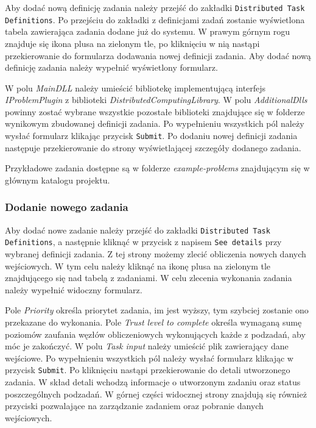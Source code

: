 \documentclass[a4paper,11pt,twoside]{report}
\theoremstyle{definition}
\begin{document}
        Aby dodać nową definicję zadania należy przejść do zakładki \texttt{Distributed Task Definitions}. 
        Po przejściu do zakładki z definicjami zadań zostanie wyświetlona tabela zawierająca zadania dodane już do systemu. 
        W prawym górnym rogu znajduje się ikona plusa na zielonym tle, po kliknięciu w nią nastąpi przekierowanie do formularza dodawania nowej definicji zadania.
        Aby dodać nową definicję zadania należy wypełnić wyświetlony formularz.
        
        W polu \textit{MainDLL} należy umieścić bibliotekę implementującą interfejs \textit{IProblemPlugin} z biblioteki \textit{DistributedComputingLibrary}.
        W polu \textit{AdditionalDlls} powinny zostać wybrane wszystkie pozostałe biblioteki znajdujące się w folderze wynikowym zbudowanej definicji zadania.
        Po wypełnieniu wszystkich pól należy wysłać formularz klikając przycisk \texttt{Submit}.
        Po dodaniu nowej definicji zadania następuje przekierowanie do strony wyświetlającej szczegóły dodanego zadania. 
        
        Przykładowe zadania dostępne są w folderze \textit{example-problems} znajdującym się w głównym katalogu projektu.
        
        
        \subsubsection{Dodanie nowego zadania}
        \label{distributed-task-add-guide}
        
        Aby dodać nowe zadanie należy przejść do zakładki \texttt{Distributed Task Definitions}, a następnie kliknąć w przycisk z napisem \texttt{See details} przy wybranej definicji zadania.
        Z tej strony możemy zlecić obliczenia nowych danych wejściowych.
        W tym celu należy kliknąć na ikonę plusa na zielonym tle znajdującego się nad tabelą z zadaniami.
        W celu zlecenia wykonania zadania należy wypełnić widoczny formularz.
        
        Pole \textit{Priority} określa priorytet zadania, im jest wyższy, tym szybciej zostanie ono przekazane do wykonania.
        Pole \textit{Trust level to complete} określa wymaganą sumę poziomów zaufania węzłów obliczeniowych wykonujących każde z podzadań, aby móc je zakończyć. 
        W polu \textit{Task input} należy umieścić plik zawierający dane wejściowe.
        Po wypełnieniu wszystkich pól należy wysłać formularz klikając w przycisk \texttt{Submit}. Po kliknięciu nastąpi przekierowanie do detali utworzonego zadania. 
        W skład detali wchodzą informacje o utworzonym zadaniu oraz status poszczególnych podzadań. W górnej części widocznej strony znajdują się również przyciski pozwalające na zarządzanie zadaniem oraz pobranie danych wejściowych.
        
\end{document}
